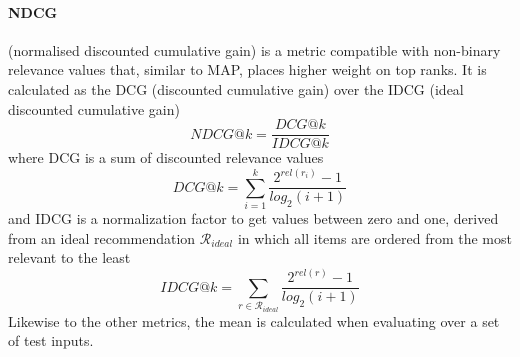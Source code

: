 \paragraph{NDCG} (normalised discounted cumulative gain) is a metric compatible with non-binary relevance values that, similar to MAP, places higher weight on top ranks. It is calculated as the DCG (discounted cumulative gain) over the IDCG (ideal discounted cumulative gain)
 \[ \mathit{NDCG}@k = \frac{DCG@k}{IDCG@k} \]
where DCG is a sum of discounted relevance values
 \[ \mathit{DCG}@k = \sum\limits_{i=1}^{k} \frac{2^{\mathit{rel}(r_i)}-1}{\mathit{log}_2(i+1)} \]
and IDCG is a normalization factor to get values between zero and one, derived from an ideal recommendation $\mathcal{R}_{\mathit{ideal}}$ in which all items are ordered from the most relevant to the least
 \[ \mathit{IDCG}@k = \sum\limits_{r\in\mathcal{R}_{\mathit{ideal}}}\frac{2^{\mathit{rel}(r)}-1}{\mathit{log}_2(i+1)} \]
Likewise to the other metrics, the mean is calculated when evaluating over a set of test inputs.
